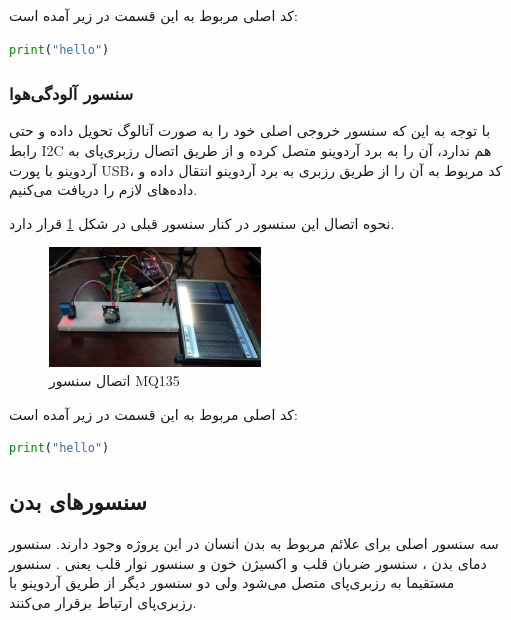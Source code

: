 کد اصلی مربوط به این قسمت در زیر آمده است:

\begin{latin}
\begin{lstlisting}[language=python]
	print("hello")
\end{lstlisting}
\end{latin}

\subsubsection{سنسور آلودگی‌هوا}

با توجه به این که  سنسور  خروجی اصلی خود را به صورت آنالوگ تحویل داده و حتی رابط I2C هم ندارد، آن را به برد آردوینو متصل کرده و از طریق اتصال رزبری‌پای به آردوینو با پورت USB، کد مربوط به آن را از طریق رزبری به برد آردوینو انتقال داده و داده‌های لازم را دریافت می‌کنیم.

نحوه اتصال این سنسور در کنار سنسور قبلی در شکل \ref{fig:3} قرار دارد.

\begin{figure}[h]
	\centering
	\includegraphics[width=0.5\textwidth]{figs/dhtmq2.jpg}
	
	\caption{اتصال سنسور MQ135}
	\label{fig:3}
\end{figure}

کد اصلی مربوط به این قسمت در زیر آمده است:

\begin{latin}
	\begin{lstlisting}[language=python]
		print("hello")
	\end{lstlisting}
\end{latin}


\subsection{سنسورهای بدن}

سه سنسور اصلی برای علائم مربوط به بدن انسان در این پروژه وجود دارند. سنسور دمای بدن ، سنسور  ضربان قلب و اکسیژن خون  و سنسور نوار قلب یعنی . سنسور  مستقیما به رزبری‌پای متصل می‌شود ولی دو سنسور دیگر از طریق آردوینو با رزبری‌پای ارتباط برقرار می‌کنند.


